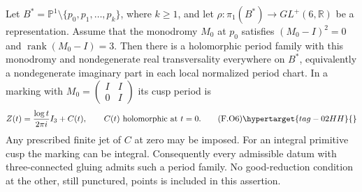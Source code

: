 \begin{theorem}\hypertarget{tag-02O3}{}\label{maps:src:F.3.11}


Let
$B^*=\mathbb P^1\setminus\{p_0,p_1,\ldots,p_k\}$,
where $k\ge1$, and let
$\rho:\pi_1(B^*)\to GL^+(6,\mathbb R)$ be a representation.
Assume that the monodromy $M_0$ at $p_0$ satisfies
$(M_0-I)^2=0$ and $\operatorname{rank}(M_0-I)=3$.
Then there is a holomorphic period family with this monodromy
and nondegenerate real transversality everywhere on $B^*$,
equivalently a nondegenerate imaginary part in each local
normalized period chart.
In a marking with $M_0=\left(\begin{smallmatrix}I&I\\0&I\end{smallmatrix}\right)$
its cusp period is
\[
 Z(t)=\frac{\log t}{2\pi i}I_3+C(t),
 \qquad C(t)\text{ holomorphic at }t=0.
 \tag{F.O6}\hypertarget{tag-02HH}{}\label{maps:eq:F.O6}
\]
Any prescribed finite jet of $C$ at zero may be imposed.
For an integral primitive cusp the marking can be integral.
Consequently every admissible datum with three-connected gluing admits such a period family.  No good-reduction
condition at the other, still punctured, points is included
in this assertion.

\end{theorem}


